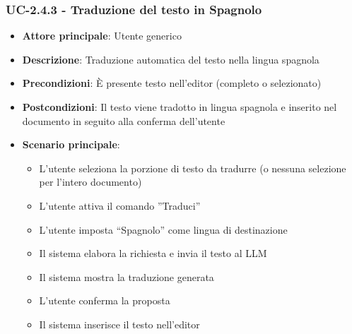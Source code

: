 \documentclass[11pt,a4paper]{article}
\begin{document}
\subsubsection{UC-2.4.3 - Traduzione del testo in Spagnolo}
\begin{itemize}
    \item \textbf{Attore principale}: Utente generico
    \item \textbf{Descrizione}: Traduzione automatica del testo nella lingua spagnola
    \item \textbf{Precondizioni}: È presente testo nell’editor (completo o selezionato)
    \item \textbf{Postcondizioni}: Il testo viene tradotto in lingua spagnola e inserito nel documento in seguito alla conferma dell'utente
    \item \textbf{Scenario principale}:
    \begin{itemize}
        \item L’utente seleziona la porzione di testo da tradurre (o nessuna selezione per l'intero documento)
        \item L’utente attiva il comando ”Traduci”
        \item L’utente imposta “Spagnolo” come lingua di destinazione
        \item Il sistema elabora la richiesta e invia il testo al LLM
        \item Il sistema mostra la traduzione generata
        \item L'utente conferma la proposta
        \item Il sistema inserisce il testo nell'editor
    \end{itemize}
\end{itemize}
\end{document}
